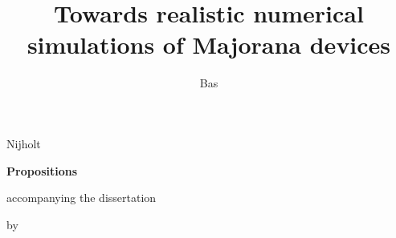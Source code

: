 \documentclass{dissertation}
\begin{document}
\title{Towards realistic numerical simulations of Majorana devices}  %
\author{Bas}{Nijholt}

\begin{center}

{\Large\titlefont\bfseries Propositions}

\bigskip

accompanying the dissertation

\bigskip

{\makeatletter
\titlestyle\bfseries\large\@title
\makeatother}

{\makeatletter
\ifx\@subtitle\undefined\else
    \titlefont\titleshape\@subtitle
\fi
\makeatother}

\bigskip

by

\bigskip

\makeatletter
{\large\titlefont\bfseries\@firstname\ {\titleshape\@lastname}}
\makeatother

\end{center}

\bigskip
\end{document}
